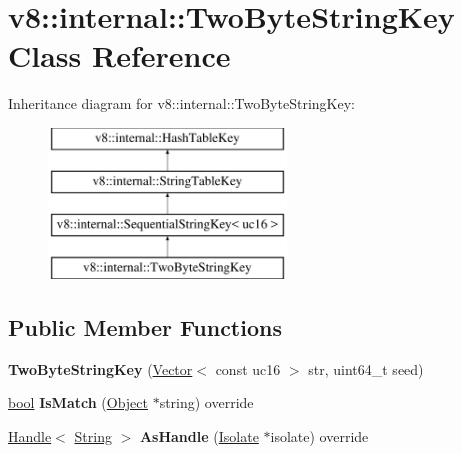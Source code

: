 \hypertarget{classv8_1_1internal_1_1TwoByteStringKey}{}\section{v8\+:\+:internal\+:\+:Two\+Byte\+String\+Key Class Reference}
\label{classv8_1_1internal_1_1TwoByteStringKey}
Inheritance diagram for v8\+:\+:internal\+:\+:Two\+Byte\+String\+Key\+:\begin{figure}[H]
\begin{center}
\leavevmode
\includegraphics[height=4.000000cm]{classv8_1_1internal_1_1TwoByteStringKey}
\end{center}
\end{figure}
\subsection*{Public Member Functions}
\begin{DoxyCompactItemize}
\item 
\mbox{\label{classv8_1_1internal_1_1TwoByteStringKey_adeddbcd3bc3c6aed52defdca6e3335f3}} 
{\bfseries Two\+Byte\+String\+Key} (\mbox{\hyperlink{classv8_1_1internal_1_1Vector}{Vector}}$<$ const uc16 $>$ str, uint64\+\_\+t seed)
\item 
\mbox{\label{classv8_1_1internal_1_1TwoByteStringKey_a617f823ad3031de2c96c242ea55d1cc0}} 
\mbox{\hyperlink{classbool}{bool}} {\bfseries Is\+Match} (\mbox{\hyperlink{classv8_1_1internal_1_1Object}{Object}} $\ast$string) override
\item 
\mbox{\label{classv8_1_1internal_1_1TwoByteStringKey_a918ca49d064e0f3779896b7a687b70ef}} 
\mbox{\hyperlink{classv8_1_1internal_1_1Handle}{Handle}}$<$ \mbox{\hyperlink{classv8_1_1internal_1_1String}{String}} $>$ {\bfseries As\+Handle} (\mbox{\hyperlink{classv8_1_1internal_1_1Isolate}{Isolate}} $\ast$isolate) override
\end{DoxyCompactItemize}
